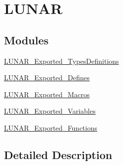 \hypertarget{group___l_u_n_a_r}{}\section{L\+U\+N\+AR}
\label{group___l_u_n_a_r}
\subsection*{Modules}
\begin{DoxyCompactItemize}
\item 
\mbox{\hyperlink{group___l_u_n_a_r___exported___types_definitions}{L\+U\+N\+A\+R\+\_\+\+Exported\+\_\+\+Types\+Definitions}}
\item 
\mbox{\hyperlink{group___l_u_n_a_r___exported___defines}{L\+U\+N\+A\+R\+\_\+\+Exported\+\_\+\+Defines}}
\item 
\mbox{\hyperlink{group___l_u_n_a_r___exported___macros}{L\+U\+N\+A\+R\+\_\+\+Exported\+\_\+\+Macros}}
\item 
\mbox{\hyperlink{group___l_u_n_a_r___exported___variables}{L\+U\+N\+A\+R\+\_\+\+Exported\+\_\+\+Variables}}
\item 
\mbox{\hyperlink{group___l_u_n_a_r___exported___functions}{L\+U\+N\+A\+R\+\_\+\+Exported\+\_\+\+Functions}}
\end{DoxyCompactItemize}


\subsection{Detailed Description}
